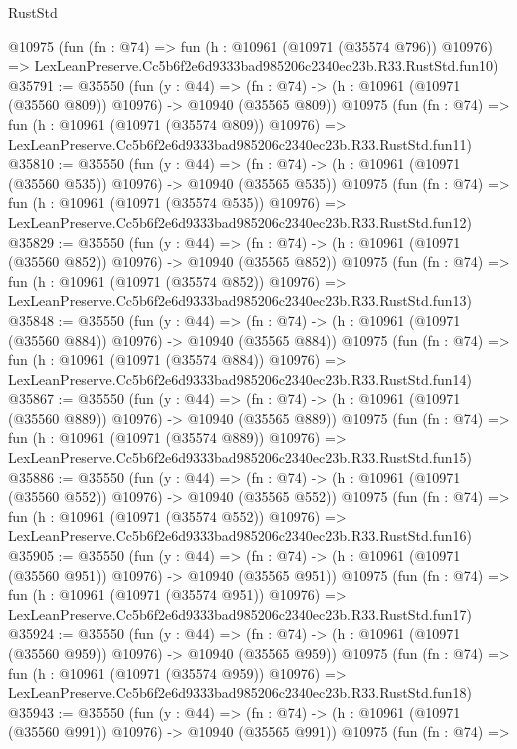 \begin{lexlean}{RustStd}
\begin{coremodule}
    @10975
    (fun (fn : @74) =>
    fun (h : @10961 (@10971 (@35574 @796)) @10976) =>
    LexLeanPreserve.Cc5b6f2e6d9333bad985206c2340ec23b.R33.RustStd.fun10)
@35791 := @35550
    (fun (y : @44) =>
    (fn : @74) -> (h : @10961 (@10971 (@35560 @809)) @10976) -> @10940 (@35565 @809))
    @10975
    (fun (fn : @74) =>
    fun (h : @10961 (@10971 (@35574 @809)) @10976) =>
    LexLeanPreserve.Cc5b6f2e6d9333bad985206c2340ec23b.R33.RustStd.fun11)
@35810 := @35550
    (fun (y : @44) =>
    (fn : @74) -> (h : @10961 (@10971 (@35560 @535)) @10976) -> @10940 (@35565 @535))
    @10975
    (fun (fn : @74) =>
    fun (h : @10961 (@10971 (@35574 @535)) @10976) =>
    LexLeanPreserve.Cc5b6f2e6d9333bad985206c2340ec23b.R33.RustStd.fun12)
@35829 := @35550
    (fun (y : @44) =>
    (fn : @74) -> (h : @10961 (@10971 (@35560 @852)) @10976) -> @10940 (@35565 @852))
    @10975
    (fun (fn : @74) =>
    fun (h : @10961 (@10971 (@35574 @852)) @10976) =>
    LexLeanPreserve.Cc5b6f2e6d9333bad985206c2340ec23b.R33.RustStd.fun13)
@35848 := @35550
    (fun (y : @44) =>
    (fn : @74) -> (h : @10961 (@10971 (@35560 @884)) @10976) -> @10940 (@35565 @884))
    @10975
    (fun (fn : @74) =>
    fun (h : @10961 (@10971 (@35574 @884)) @10976) =>
    LexLeanPreserve.Cc5b6f2e6d9333bad985206c2340ec23b.R33.RustStd.fun14)
@35867 := @35550
    (fun (y : @44) =>
    (fn : @74) -> (h : @10961 (@10971 (@35560 @889)) @10976) -> @10940 (@35565 @889))
    @10975
    (fun (fn : @74) =>
    fun (h : @10961 (@10971 (@35574 @889)) @10976) =>
    LexLeanPreserve.Cc5b6f2e6d9333bad985206c2340ec23b.R33.RustStd.fun15)
@35886 := @35550
    (fun (y : @44) =>
    (fn : @74) -> (h : @10961 (@10971 (@35560 @552)) @10976) -> @10940 (@35565 @552))
    @10975
    (fun (fn : @74) =>
    fun (h : @10961 (@10971 (@35574 @552)) @10976) =>
    LexLeanPreserve.Cc5b6f2e6d9333bad985206c2340ec23b.R33.RustStd.fun16)
@35905 := @35550
    (fun (y : @44) =>
    (fn : @74) -> (h : @10961 (@10971 (@35560 @951)) @10976) -> @10940 (@35565 @951))
    @10975
    (fun (fn : @74) =>
    fun (h : @10961 (@10971 (@35574 @951)) @10976) =>
    LexLeanPreserve.Cc5b6f2e6d9333bad985206c2340ec23b.R33.RustStd.fun17)
@35924 := @35550
    (fun (y : @44) =>
    (fn : @74) -> (h : @10961 (@10971 (@35560 @959)) @10976) -> @10940 (@35565 @959))
    @10975
    (fun (fn : @74) =>
    fun (h : @10961 (@10971 (@35574 @959)) @10976) =>
    LexLeanPreserve.Cc5b6f2e6d9333bad985206c2340ec23b.R33.RustStd.fun18)
@35943 := @35550
    (fun (y : @44) =>
    (fn : @74) -> (h : @10961 (@10971 (@35560 @991)) @10976) -> @10940 (@35565 @991))
    @10975
    (fun (fn : @74) =>

\end{coremodule}
\end{lexlean}
